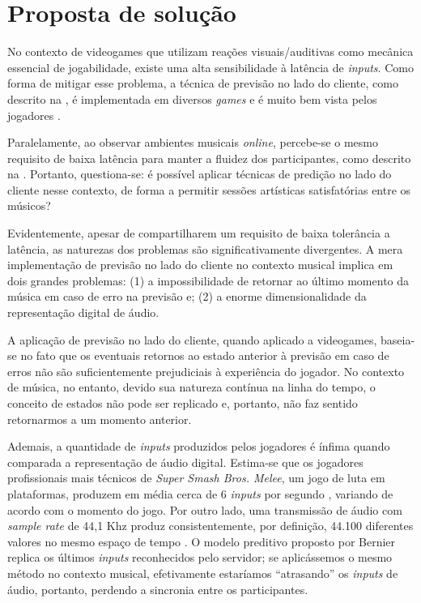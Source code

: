 \chapter{Proposta de solução}

No contexto de videogames que utilizam reações visuais/auditivas como mecânica essencial de jogabilidade, existe uma alta sensibilidade à latência de \textit{inputs}. Como forma de mitigar esse problema, a técnica de previsão no lado do cliente, como descrito na , é implementada em diversos \textit{games} e é muito bem vista pelos jogadores \cite{rollback_success}.

Paralelamente, ao observar ambientes musicais \textit{online}, percebe-se o mesmo requisito de baixa latência para manter a fluidez dos participantes, como descrito na . Portanto, questiona-se: é possível aplicar técnicas de predição no lado do cliente nesse contexto, de forma a permitir sessões artísticas satisfatórias entre os músicos?

Evidentemente, apesar de compartilharem um requisito de baixa tolerância a latência, as naturezas dos problemas são significativamente divergentes. A mera implementação de previsão no lado do cliente no contexto musical implica em dois grandes problemas: (1) a impossibilidade de retornar ao último momento da música em caso de erro na previsão e; (2) a enorme dimensionalidade da representação digital de áudio.

A aplicação de previsão no lado do cliente, quando aplicado a videogames, baseia-se no fato que os eventuais retornos ao estado anterior à previsão em caso de erros não são suficientemente prejudiciais à experiência do jogador. No contexto de música, no entanto, devido sua natureza contínua na linha do tempo, o conceito de estados não pode ser replicado e, portanto, não faz sentido retornarmos a um momento anterior.
 
Ademais, a quantidade de \textit{inputs} produzidos pelos jogadores é ínfima quando comparada a representação de áudio digital. Estima-se que os jogadores profissionais mais técnicos de \textit{Super Smash Bros. Melee}, um jogo de luta em plataformas, produzem em média cerca de 6 \textit{inputs} por segundo \cite{melee_inputs_per_second}, variando de acordo com o momento do jogo. Por outro lado, uma transmissão de áudio com \textit{sample rate} de 44,1 Khz produz consistentemente, por definição, 44.100 diferentes valores no mesmo espaço de tempo \cite{jukebox_dimension}. O modelo preditivo proposto por Bernier \cite{client-side-prediction} replica os últimos \textit{inputs} reconhecidos pelo servidor; se aplicássemos o mesmo método no contexto musical, efetivamente estaríamos ``atrasando'' os \textit{inputs} de áudio, portanto, perdendo a sincronia entre os participantes.

